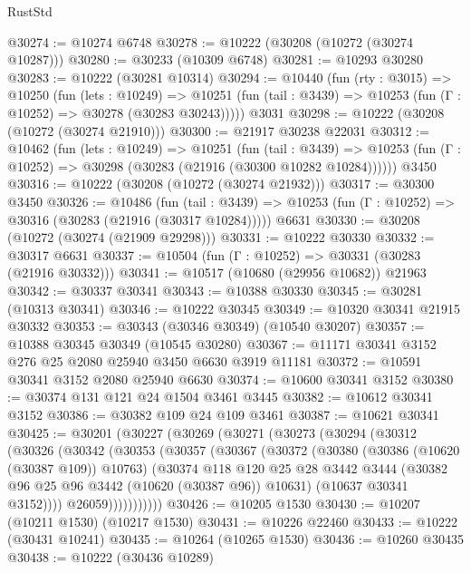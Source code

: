 \begin{lexlean}{RustStd}
\begin{coremodule}
@30274 := @10274 @6748
@30278 := @10222 (@30208 (@10272 (@30274 @10287)))
@30280 := @30233 (@10309 @6748)
@30281 := @10293 @30280
@30283 := @10222 (@30281 @10314)
@30294 := @10440
    (fun (rty : @3015) =>
    @10250
      (fun (lets : @10249) =>
      @10251 (fun (tail : @3439) => @10253 (fun (Γ : @10252) => @30278 (@30283 @30243)))))
    @3031
@30298 := @10222 (@30208 (@10272 (@30274 @21910)))
@30300 := @21917 @30238 @22031
@30312 := @10462
    (fun (lets : @10249) =>
    @10251
      (fun (tail : @3439) =>
      @10253 (fun (Γ : @10252) => @30298 (@30283 (@21916 (@30300 @10282 @10284))))))
    @3450
@30316 := @10222 (@30208 (@10272 (@30274 @21932)))
@30317 := @30300 @3450
@30326 := @10486
    (fun (tail : @3439) => @10253 (fun (Γ : @10252) => @30316 (@30283 (@21916 (@30317 @10284)))))
    @6631
@30330 := @30208 (@10272 (@30274 (@21909 @29298)))
@30331 := @10222 @30330
@30332 := @30317 @6631
@30337 := @10504 (fun (Γ : @10252) => @30331 (@30283 (@21916 @30332)))
@30341 := @10517 (@10680 (@29956 @10682)) @21963
@30342 := @30337 @30341
@30343 := @10388 @30330
@30345 := @30281 (@10313 @30341)
@30346 := @10222 @30345
@30349 := @10320 @30341 @21915 @30332
@30353 := @30343 (@30346 @30349) (@10540 @30207)
@30357 := @10388 @30345 @30349 (@10545 @30280)
@30367 := @11171 @30341 @3152 @276 @25 @2080 @25940 @3450 @6630 @3919 @11181
@30372 := @10591 @30341 @3152 @2080 @25940 @6630
@30374 := @10600 @30341 @3152
@30380 := @30374 @131 @121 @24 @1504 @3461 @3445
@30382 := @10612 @30341 @3152
@30386 := @30382 @109 @24 @109 @3461
@30387 := @10621 @30341
@30425 := @30201
    (@30227
      (@30269
        (@30271
          (@30273
            (@30294
              (@30312
                (@30326
                  (@30342
                    (@30353
                      (@30357
                        (@30367
                          (@30372
                            (@30380
                              (@30386 (@10620 (@30387 @109)) @10763)
                              (@30374
                                @118
                                @120
                                @25
                                @28
                                @3442
                                @3444
                                (@30382 @96 @25 @96 @3442 (@10620 (@30387 @96)) @10631)
                                (@10637 @30341 @3152))))
                          @26059)))))))))))
@30426 := @10205 @1530
@30430 := @10207 (@10211 @1530) (@10217 @1530)
@30431 := @10226 @22460
@30433 := @10222 (@30431 @10241)
@30435 := @10264 (@10265 @1530)
@30436 := @10260 @30435
@30438 := @10222 (@30436 @10289)

\end{coremodule}
\end{lexlean}
